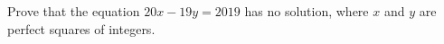 Prove that the equation $20x-19y=2019$ has no solution, where $x$ and $y$ are perfect squares of integers. 